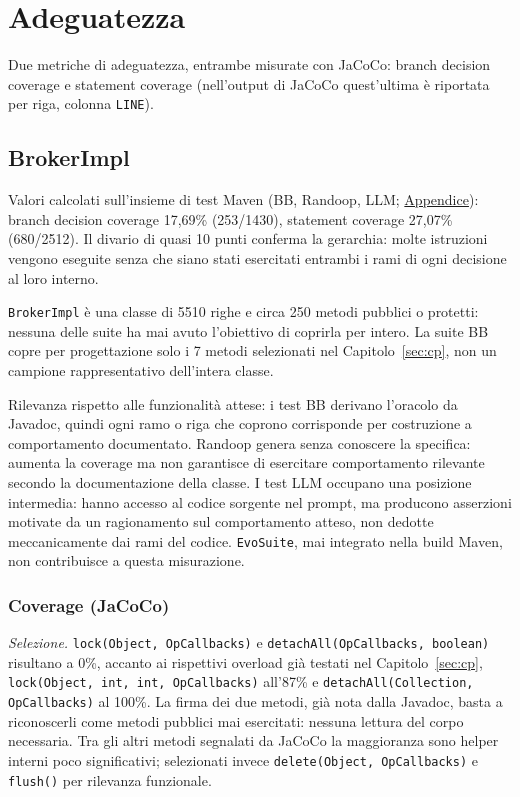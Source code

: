 \section{Adeguatezza}
\label{sec:adeguatezza}

Due metriche di adeguatezza, entrambe misurate con JaCoCo: branch decision coverage e statement
coverage (nell'output di JaCoCo quest'ultima è riportata per riga, colonna \texttt{LINE}).

\subsection{BrokerImpl}

Valori calcolati sull'insieme di test Maven (BB, Randoop, LLM;
\hyperref[cmd:jacoco-brokerimpl]{Appendice}): branch decision coverage 17,69\% (253/1430),
statement coverage 27,07\% (680/2512). Il divario di quasi 10 punti conferma la gerarchia: molte
istruzioni vengono eseguite senza che siano stati esercitati entrambi i rami di ogni decisione al
loro interno.

\texttt{BrokerImpl} è una classe di 5510 righe e circa 250 metodi pubblici o protetti: nessuna
delle suite ha mai avuto l'obiettivo di coprirla per intero. La suite BB copre per progettazione
solo i 7 metodi selezionati nel Capitolo~\ref{sec:cp}, non un campione rappresentativo dell'intera
classe.

Rilevanza rispetto alle funzionalità attese: i test BB derivano l'oracolo da Javadoc, quindi ogni
ramo o riga che coprono corrisponde per costruzione a comportamento documentato. Randoop genera
senza conoscere la specifica: aumenta la coverage ma non garantisce di esercitare comportamento
rilevante secondo la documentazione della classe. I test LLM occupano una posizione intermedia:
hanno accesso al codice sorgente nel prompt, ma producono asserzioni motivate da un ragionamento
sul comportamento atteso, non dedotte meccanicamente dai rami del codice. \texttt{EvoSuite}, mai
integrato nella build Maven, non contribuisce a questa misurazione.

\subsubsection{Coverage (JaCoCo)}

\textit{Selezione.}
\texttt{lock(Object, OpCallbacks)} e \texttt{detachAll(OpCallbacks, boolean)} risultano a 0\%,
accanto ai rispettivi overload già testati nel Capitolo~\ref{sec:cp},
\texttt{lock(Object, int, int, OpCallbacks)} all'87\% e \texttt{detachAll(Collection,
OpCallbacks)} al 100\%. La firma dei due metodi, già nota dalla Javadoc, basta a riconoscerli come
metodi pubblici mai esercitati: nessuna lettura del corpo necessaria. Tra gli altri metodi
segnalati da JaCoCo la maggioranza sono helper interni poco significativi; selezionati invece
\texttt{delete(Object, OpCallbacks)} e \texttt{flush()} per rilevanza funzionale.

